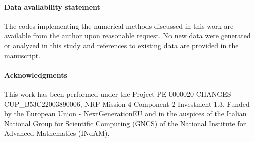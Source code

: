 \documentclass[11pt,letterpaper]{article}
\theoremstyle{remark}
\begin{document}
\paragraph{Data availability statement} The codes implementing the numerical methods discussed in this work are available from the author upon reasonable request. No new data were generated or analyzed in this study and references to existing data are provided in the manuscript.

\paragraph{Acknowledgments} This work has been performed under the Project PE 0000020 CHANGES - CUP\_B53C22003890006, NRP Mission 4 Component 2 Investment 1.3, Funded by the European Union - NextGenerationEU and in the auspices of the Italian National Group for Scientific Computing (GNCS) of the National Institute for Advanced Mathematics (INdAM).





\end{document}
